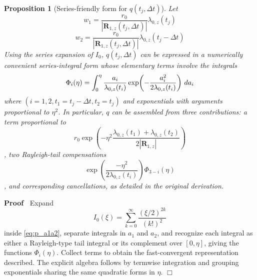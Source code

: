 \documentclass{article}
\newcommand{\tmmathbf}[1]{\ensuremath{\boldsymbol{#1}}}
\newenvironment{proof}{\noindent\textbf{Proof\ }}{\hspace*{\fill}$\Box$\medskip}
\newtheorem{proposition}{Proposition}
\begin{document}
\begin{proposition}
  [Series-friendly form for $q (t_j, \Delta t)$]\label{prop:q_series} Let
  \begin{equation}
    w_1 = \frac{r_0}{|\tmmathbf{R}_{1, z} (t_j, \Delta t) |} \lambda_{0, z}
    (t_j)
  \end{equation}
  \begin{equation}
    w_2 = \frac{r_0}{|\tmmathbf{R}_{1, z} (t_j, \Delta t) |} \lambda_{0, z} 
    (t_j - \Delta t)
  \end{equation}
  Using the series expansion of $I_0$, $q (t_j, \Delta t)$ can be expressed in
  a numerically convenient series-integral form whose elementary terms involve
  the integrals
  \begin{equation}
    \Phi_i (\eta) = \int_0^{\eta} \frac{a_i}{\lambda_{0, z} (t_i)} \exp
    \hspace{-0.17em} \left( - \frac{a_i^2}{2 \lambda_{0, z} (t_i)} \right) 
    \hspace{0.17em} da_i
  \end{equation}
  where $(i = 1, 2, t_1 = t_j - \Delta t, t_2 = t_j)$ and exponentials with
  arguments proportional to $\eta^2$. In particular, $q$ can be assembled from
  three contributions: a term proportional to
  \begin{equation}
    r_0 \exp \left( - \eta^2  \frac{\lambda_{0, z} (t_1) + \lambda_{0, z}
    (t_2)}{2|\tmmathbf{R}_{1, z} |} \right)
  \end{equation}
  , two Rayleigh-tail compensations
  \begin{equation}
    \exp \left( \frac{- \eta^2}{2 \lambda_{0, z} (t_i)} \right) \Phi_{3 - i}
    (\eta)
  \end{equation}
  , and corresponding cancellations, as detailed in the original derivation.
\end{proposition}

\begin{proof}
  Expand
  \begin{equation}
    I_0 (\xi) = \sum_{k = 0}^{\infty} \frac{(\xi / 2)^{2 k}}{(k!)^2}
  \end{equation}
  inside \eqref{eq:p_a1a2}, separate integrals in $a_1$ and $a_2$, and
  recognize each integral as either a Rayleigh-type tail integral or its
  complement over $[0, \eta]$, giving the functions $\Phi_i (\eta)$. Collect
  terms to obtain the fast-convergent representation described. The explicit
  algebra follows by termwise integration and grouping exponentials sharing
  the same quadratic forms in $\eta$.
\end{proof}
\end{document}
